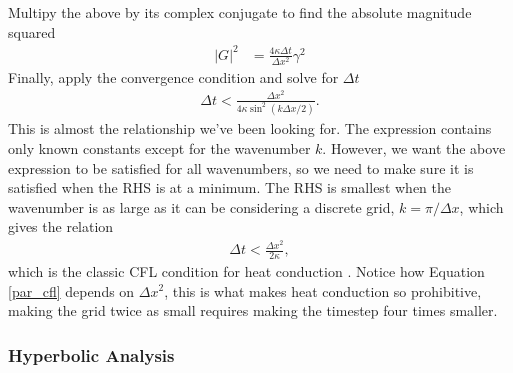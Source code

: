 \documentclass[iop]{emulateapj}
\begin{document}
				Multipy the above by its complex conjugate to find the absolute magnitude squared
				\begin{align}
					|G|^2 &= \frac{4 \kappa \Delta t}{\Delta x^2} \gamma^2
				\end{align}
				Finally, apply the convergence condition and solve for $\Delta t$
				\begin{align}
					\Delta t < \frac{\Delta x^2}{4 \kappa \sin^2(k \Delta x / 2)}. \label{par_cfl_2}
				\end{align}
				This is almost the relationship we've been looking for. 
				The expression contains only known constants except for the wavenumber $k$.
				However, we want the above expression to be satisfied for all wavenumbers, so we need to make sure it is satisfied when the \ac{RHS} is at a minimum.
				The \ac{RHS} is smallest when the wavenumber is as large as it can be considering a discrete grid, $k = \pi / \Delta x$, which gives the relation
				\begin{align}
					\Delta t < \frac{\Delta x^2}{2 \kappa}, \label{par_cfl}
				\end{align}
				which is the classic \ac{CFL} condition for heat conduction \cite{cfd_book}.
				Notice how Equation \ref{par_cfl} depends on $\Delta x^2$, this is what makes heat conduction so prohibitive, making the grid twice as small requires making the timestep four times smaller.
			
			\subsubsection{Hyperbolic Analysis}
			
\end{document}
